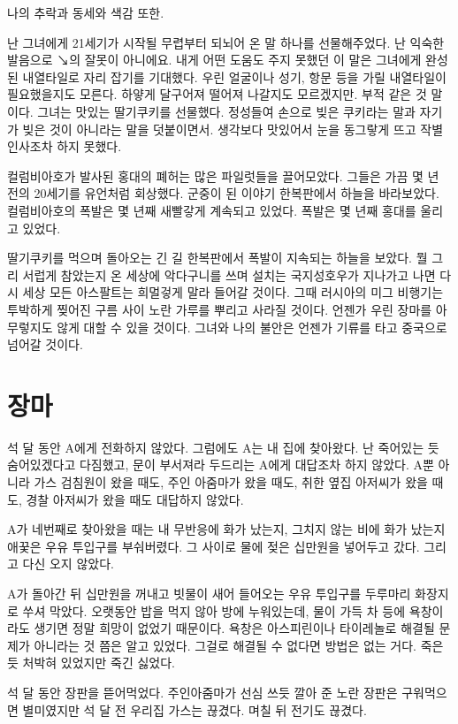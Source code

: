 \documentclass[a5paper,10pt, twoside, openright]{memoir}
\begin{document}
	나의 추락과 동세와 색감 또한.

	난 그녀에게 21세기가 시작될 무렵부터 되뇌어 온 말 하나를 선물해주었다. 난 익숙한 발음으로 ↘의 잘못이 아니에요. 내게 어떤 도움도 주지 못했던 이 말은 그녀에게 완성된 내열타일로 자리 잡기를 기대했다. 우린 얼굴이나 성기, 항문 등을 가릴 내열타일이 필요했을지도 모른다. 하얗게 달구어져 떨어져 나갈지도 모르겠지만. 부적 같은 것 말이다. 그녀는 맛있는 딸기쿠키를 선물했다. 정성들여 손으로 빚은 쿠키라는 말과 자기가 빚은 것이 아니라는 말을 덧붙이면서. 생각보다 맛있어서 눈을 동그랗게 뜨고 작별인사조차 하지 못했다.

	컬럼비아호가 발사된 홍대의 폐허는 많은 파일럿들을 끌어모았다. 그들은 가끔 몇 년 전의 20세기를 유언처럼 회상했다. 군중이 된 이야기 한복판에서 하늘을 바라보았다. 컬럼비아호의 폭발은 몇 년째 새빨갛게 계속되고 있었다. 폭발은 몇 년째 홍대를 울리고 있었다.

	딸기쿠키를 먹으며 돌아오는 긴 길 한복판에서 폭발이 지속되는 하늘을 보았다. 뭘 그리 서럽게 참았는지 온 세상에 악다구니를 쓰며 설치는 국지성호우가 지나가고 나면 다시 세상 모든 아스팔트는 희멀겋게 말라 들어갈 것이다. 그때 러시아의 미그 비행기는 투박하게 찢어진 구름 사이 노란 가루를 뿌리고 사라질 것이다. 언젠가 우린 장마를 아무렇지도 않게 대할 수 있을 것이다. 그녀와 나의 불안은 언젠가 기류를 타고 중국으로 넘어갈 것이다.



			\chapter{장마} 

	석 달 동안 A에게 전화하지 않았다. 그럼에도 A는 내 집에 찾아왔다. 난 죽어있는 듯 숨어있겠다고 다짐했고, 문이 부서져라 두드리는 A에게 대답조차 하지 않았다. A뿐 아니라 가스 검침원이 왔을 때도, 주인 아줌마가 왔을 때도, 취한 옆집 아저씨가 왔을 때도, 경찰 아저씨가 왔을 때도 대답하지 않았다. 

	A가 네번째로 찾아왔을 때는 내 무반응에 화가 났는지, 그치지 않는 비에 화가 났는지 애꿎은 우유 투입구를 부숴버렸다. 그 사이로 물에 젖은 십만원을 넣어두고 갔다. 그리고 다신 오지 않았다. 

	A가 돌아간 뒤 십만원을 꺼내고 빗물이 새어 들어오는 우유 투입구를 두루마리 화장지로 쑤셔 막았다. 오랫동안 밥을 먹지 않아 방에 누워있는데, 물이 가득 차 등에 욕창이라도 생기면 정말 희망이 없었기 때문이다. 욕창은 아스피린이나 타이레놀로 해결될 문제가 아니라는 것 쯤은 알고 있었다. 그걸로 해결될 수 없다면 방법은 없는 거다. 죽은 듯 처박혀 있었지만 죽긴 싫었다.

	석 달 동안 장판을 뜯어먹었다. 주인아줌마가 선심 쓰듯 깔아 준 노란 장판은 구워먹으면 별미였지만 석 달 전 우리집 가스는 끊겼다. 며칠 뒤 전기도 끊겼다. 
\end{document}
